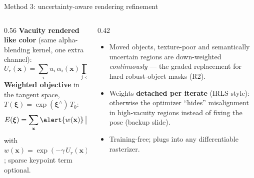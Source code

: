 \documentclass[aspectratio=169,10pt]{beamer}
\begin{document}
\begin{frame}{Method 3: uncertainty-aware rendering refinement}
  \begin{columns}[T]
    \begin{column}{0.56\textwidth}
      \textbf{Vacuity rendered like color} (same alpha-blending kernel,
      one extra channel):
      \begin{equation*}
        U_r(\mathbf{x}) = \sum_i u_i\, \alpha_i(\mathbf{x})
        \prod_{j<i}\big(1 - \alpha_j(\mathbf{x})\big)
      \end{equation*}
      \textbf{Weighted objective} in the tangent space,
      $T(\bm\xi) = \exp(\bm\xi^\wedge)\, T_0$:
      \begin{equation*}
        E(\bm\xi) = \sum_{\mathbf{x}}
        \alert{w(\mathbf{x})}\,\big\|I_q(\mathbf{x}) - I_r(\mathbf{x};\bm\xi)\big\|^2
        + \lambda \sum_k \|\mathbf{x}_k^q - \mathbf{x}_k^r\|^2
      \end{equation*}
      with $w(\mathbf{x}) = \exp(-\gamma\, U_r(\mathbf{x}))$; sparse
      keypoint term optional.
    \end{column}
    \begin{column}{0.42\textwidth}
      \begin{itemize}
        \item Moved objects, texture-poor and semantically uncertain regions
              are down-weighted \emph{continuously} --- the graded
              replacement for hard robust-object masks (R2).
        \item Weights \textbf{detached per iterate} (IRLS-style): otherwise
              the optimizer ``hides'' misalignment in high-vacuity regions
              instead of fixing the pose (backup slide).
        \item Training-free; plugs into any differentiable rasterizer.
      \end{itemize}
    \end{column}
  \end{columns}
\end{frame}
\end{document}
